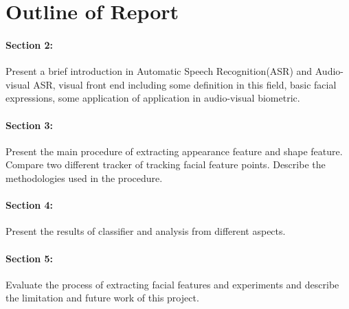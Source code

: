 \section{Outline of Report}
\paragraph{Section 2:} Present a brief introduction in Automatic Speech Recognition(ASR) and Audio-visual ASR, visual front end including some definition in this field, basic facial expressions, some application of application in audio-visual biometric.
\paragraph{Section 3:} Present the main procedure of extracting appearance feature and shape feature. Compare two different tracker of tracking facial feature points. Describe the methodologies used in the procedure. 
\paragraph{Section 4:} Present the results of classifier and analysis from different aspects.
\paragraph{Section 5:} Evaluate the process of extracting facial features and experiments and describe the limitation and future work of this project.
